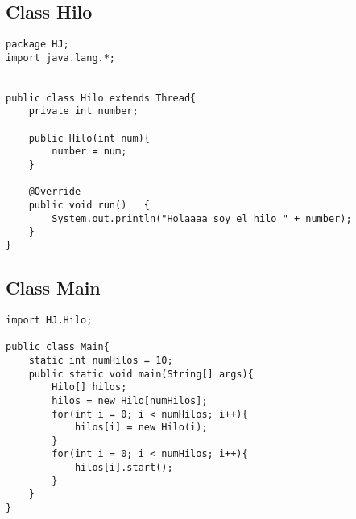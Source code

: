 \documentclass[a4paper,12pt]{article}
\begin{document}
\subsection{Class Hilo}

\begin{lstlisting}
package HJ;
import java.lang.*;


public class Hilo extends Thread{
	private int number;

	public Hilo(int num){
		number = num;
	}

	@Override
	public void run()	{
		System.out.println("Holaaaa soy el hilo " + number);
	}
}
\end{lstlisting}

\subsection{Class Main}

\begin{lstlisting}
import HJ.Hilo;

public class Main{
	static int numHilos = 10;
	public static void main(String[] args){
		Hilo[] hilos;
		hilos = new Hilo[numHilos];
		for(int i = 0; i < numHilos; i++){
			hilos[i] = new Hilo(i);
		}
		for(int i = 0; i < numHilos; i++){
			hilos[i].start();
		}
	}
}
\end{lstlisting}
\end{document}
